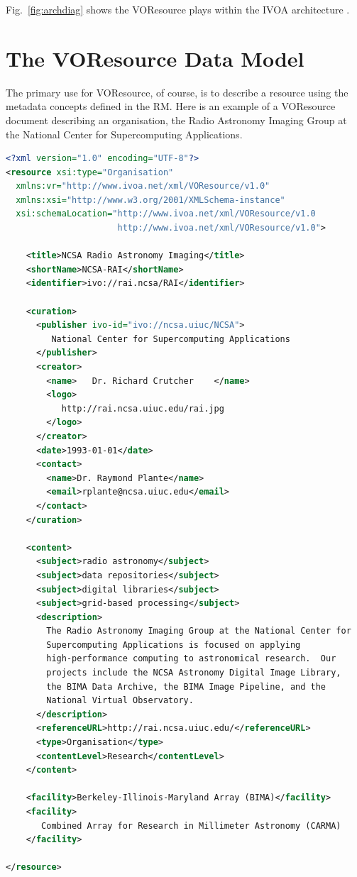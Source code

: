 \documentclass[11pt,a4paper]{ivoa}
\begin{document}
Fig.~\ref{fig:archdiag} shows the VOResource plays within the
IVOA architecture \citep{note:VOARCH}.



\section{The VOResource Data Model}
\label{sect:model}

The primary use for VOResource, of course, is to describe a resource
using the metadata concepts defined in the RM.  Here is an example of a
VOResource document describing an organisation, the Radio Astronomy
Imaging Group at the National Center for Supercomputing Applications.  

\begin{lstlisting}[language=XML,numbers=right,basicstyle=\footnotesize]
<?xml version="1.0" encoding="UTF-8"?>
<resource xsi:type="Organisation"
  xmlns:vr="http://www.ivoa.net/xml/VOResource/v1.0"
  xmlns:xsi="http://www.w3.org/2001/XMLSchema-instance"
  xsi:schemaLocation="http://www.ivoa.net/xml/VOResource/v1.0
                      http://www.ivoa.net/xml/VOResource/v1.0">

    <title>NCSA Radio Astronomy Imaging</title>
    <shortName>NCSA-RAI</shortName>
    <identifier>ivo://rai.ncsa/RAI</identifier>

    <curation>
      <publisher ivo-id="ivo://ncsa.uiuc/NCSA">
         National Center for Supercomputing Applications
      </publisher>
      <creator>
        <name>   Dr. Richard Crutcher    </name>
        <logo>
           http://rai.ncsa.uiuc.edu/rai.jpg
        </logo>
      </creator>
      <date>1993-01-01</date>
      <contact>
        <name>Dr. Raymond Plante</name>
      	<email>rplante@ncsa.uiuc.edu</email>
      </contact>
    </curation>

    <content>
      <subject>radio astronomy</subject>
      <subject>data repositories</subject>
      <subject>digital libraries</subject>
      <subject>grid-based processing</subject>
      <description>
        The Radio Astronomy Imaging Group at the National Center for
        Supercomputing Applications is focused on applying
        high-performance computing to astronomical research.  Our
        projects include the NCSA Astronomy Digital Image Library, 
        the BIMA Data Archive, the BIMA Image Pipeline, and the
        National Virtual Observatory. 
      </description>
      <referenceURL>http://rai.ncsa.uiuc.edu/</referenceURL>
      <type>Organisation</type>
      <contentLevel>Research</contentLevel>
    </content>

    <facility>Berkeley-Illinois-Maryland Array (BIMA)</facility>
    <facility>
       Combined Array for Research in Millimeter Astronomy (CARMA)
    </facility>

</resource>
\end{lstlisting}
\end{document}
